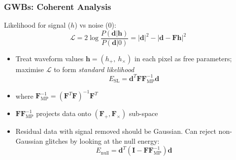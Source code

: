 \documentclass{beamer}
\begin{document}
\begin{frame}
    \frametitle{GWBs: Coherent Analysis}

    Likelihood for signal ($h$) vs noise (0):
    \begin{equation}
        \mathcal{L} = 2 \log
        \frac{P(\mathbf{d}|\mathbf{h})}{P(\mathbf{d}|0)} = |\mathbf{d}|^2  - |\mathbf{d} -
        \mathbf{F}\mathbf{h}|^2
    \end{equation}

    \begin{itemize}
        \item Treat waveform values $\mathbf{h} = (h_+,~h_{\times})$ in each
            pixel as free parameters; maximise $\mathcal{L}$ to form
            \emph{standard likelihood}
            \begin{equation}
                E_{\text{SL}} = \mathbf{d}^{T} \mathbf{F} \mathbf{F}_{\text{MP}}^{-1} \mathbf{d}
            \end{equation}
        \item where $\mathbf{F}_{\text{MP}}^{-1} = (\mathbf{F}^T\mathbf{F})^{-1}\mathbf{F}^T$
        \item $\mathbf{F}\mathbf{F}_{\text{MP}}^{-1}$ projects data onto
            $(\mathbf{F_+,F_{\times}})$ sub-space
        \item Residual data with signal removed should be Gaussian.  Can reject
            non-Gaussian glitches by looking at the null energy:
            \begin{equation}
                E_{\text{null}} =
                \mathbf{d}^{T}(\mathbf{I}-\mathbf{F}\mathbf{F}_{\text{MP}}^{-1})\mathbf{d}
            \end{equation}

    \end{itemize}

%


\end{frame}
\end{document}
